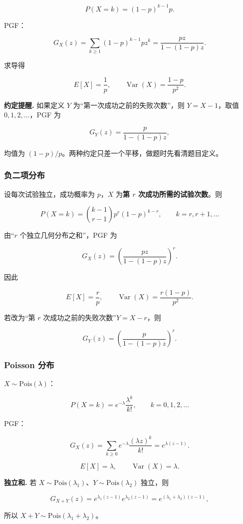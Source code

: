 \[
P(X=k)=(1-p)^{k-1}p.
\]

PGF：

\[
G_X(z)=\sum_{k\ge1}(1-p)^{k-1}pz^k
=\frac{pz}{1-(1-p)z}.
\]

求导得

\[
E[X]=\frac1p,\qquad
\operatorname{Var}(X)=\frac{1-p}{p^2}.
\]

\textbf{约定提醒.} 如果定义 $Y$ 为“第一次成功之前的失败次数”，则 $Y=X-1$，取值 $0,1,2,\dots$，PGF 为

\[
G_Y(z)=\frac{p}{1-(1-p)z},
\]

均值为 $(1-p)/p$。两种约定只差一个平移，做题时先看清题目定义。

\subsubsection{负二项分布}


设每次试验独立，成功概率为 $p$，$X$ 为\textbf{第 $r$ 次成功所需的试验次数}。则

\[
P(X=k)=\binom{k-1}{r-1}p^r(1-p)^{k-r},
\qquad k=r,r+1,\dots
\]

由“$r$ 个独立几何分布之和”，PGF 为

\[
G_X(z)=\left(\frac{pz}{1-(1-p)z}\right)^r.
\]

因此

\[
E[X]=\frac rp,\qquad
\operatorname{Var}(X)=\frac{r(1-p)}{p^2}.
\]

若改为“第 $r$ 次成功之前的失败次数”$Y=X-r$，则

\[
G_Y(z)=\left(\frac{p}{1-(1-p)z}\right)^r.
\]

\subsubsection{Poisson 分布}


$X\sim\mathrm{Pois}(\lambda)$：

\[
P(X=k)=e^{-\lambda}\frac{\lambda^k}{k!},
\qquad k=0,1,2,\dots
\]

PGF：

\[
G_X(z)=\sum_{k\ge0}e^{-\lambda}\frac{(\lambda z)^k}{k!}
=e^{\lambda(z-1)}.
\]

\[
E[X]=\lambda,\qquad \operatorname{Var}(X)=\lambda.
\]

\textbf{独立和.} 若 $X\sim\mathrm{Pois}(\lambda_1)$、$Y\sim\mathrm{Pois}(\lambda_2)$ 独立，则

\[
G_{X+Y}(z)=e^{\lambda_1(z-1)}e^{\lambda_2(z-1)}
=e^{(\lambda_1+\lambda_2)(z-1)},
\]

所以 $X+Y\sim\mathrm{Pois}(\lambda_1+\lambda_2)$。

